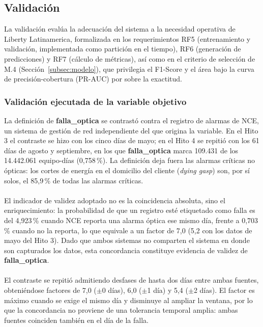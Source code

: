 \documentclass[12pt,a4paper]{article}
\begin{document}
\subsection{Validación}
\label{subsec:validacion}
\noindent
La validación evalúa la adecuación del sistema a la necesidad operativa de Liberty Latinamerica,
 formalizada en los requerimientos RF5 (entrenamiento y validación, implementada como partición en el tiempo),
  RF6 (generación de predicciones) y RF7 (cálculo de métricas), así como en el criterio de selección de M.4
   (Sección~\ref{subsec:modelo}), que privilegia el F1-Score y el área bajo la curva de precisión-cobertura (PR-AUC) 
   por sobre la exactitud.

\subsubsection{Validación ejecutada de la variable objetivo}
La definición de \textbf{falla\_optica} se contrastó contra el registro de
alarmas de NCE, un sistema de gestión de red independiente del que origina la
variable. En el Hito 3 el contraste se hizo con los cinco días de mayo; en el
Hito 4 se repitió con los 61 días de agosto y septiembre, en los que
\textbf{falla\_optica} marca 109.431 de los 14.442.061 equipo-días (0,758\,\%).
La definición deja fuera las alarmas críticas no ópticas: los cortes de energía en el
domicilio del cliente (\textit{dying gasp}) son, por sí solos, el 85,9\,\% de todas las alarmas críticas.\\\\

\noindent
El indicador de validez adoptado no es la coincidencia absoluta, sino el
enriquecimiento: la probabilidad de que un registro esté etiquetado como falla
es del 4,923\,\% cuando NCE reporta una alarma óptica ese mismo día,
frente a 0,703\,\% cuando no la reporta, lo que equivale a un factor de 7,0
(5,2 con los datos de mayo del Hito 3).
Dado que ambos sistemas no comparten el sistema en donde son capturados los datos, esta concordancia
constituye evidencia de validez de \textbf{falla\_optica}.\\\\

\noindent
El contraste se repitió admitiendo desfases de hasta dos días entre ambas
fuentes, obteniéndose factores de 7,0 ($\pm$0 días), 6,0 ($\pm$1 día) y 5,4
($\pm$2 días). El factor es máximo cuando se exige el mismo día y disminuye al
ampliar la ventana, por lo que la concordancia no proviene de una tolerancia
temporal amplia: ambas fuentes coinciden también en el día de la falla.\\\\
\end{document}
